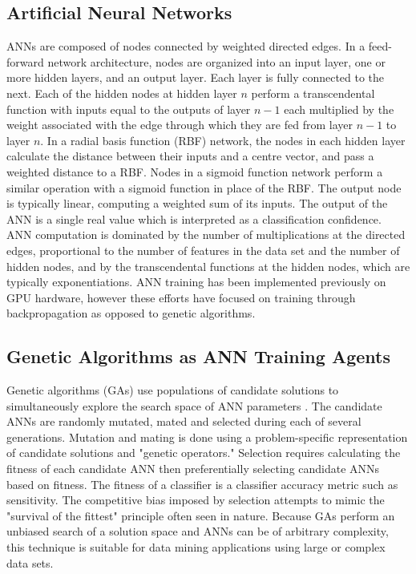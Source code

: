 \documentclass[11pt]{article}       %
\begin{document}
\subsection{Artificial Neural Networks} \label{ann}
ANNs are composed of nodes connected by weighted directed edges. In a feed-forward network architecture, nodes are organized into an input layer, one or more hidden layers, and an output layer. Each layer is fully connected to the next. Each of the hidden nodes at hidden layer $n$ perform a transcendental function with inputs equal to the outputs of layer $n-1$ each multiplied by the weight associated with the edge through which they are fed from layer $n-1$ to layer $n$. In a radial basis function (RBF) network, the nodes in each hidden layer calculate the distance between their inputs and a centre vector, and pass a weighted distance to a RBF. Nodes in a sigmoid function network perform a similar operation with a sigmoid function in place of the RBF. The output node is typically linear, computing a weighted sum of its inputs. The output of the ANN is a single real value which is interpreted as a classification confidence. ANN computation is dominated by the number of multiplications at the directed edges, proportional to the number of features in the data set and the number of hidden nodes, and by the transcendental functions at the hidden nodes, which are typically exponentiations.  ANN training has been implemented previously on GPU hardware, however these efforts have focused on training through backpropagation \cite{backprop} as opposed to genetic algorithms.

\subsection{Genetic Algorithms as ANN Training Agents} \label{ga}
Genetic algorithms (GAs) use populations of candidate solutions to simultaneously explore the search space of ANN parameters \cite{GA-ANN}. The candidate ANNs are randomly mutated, mated and selected during each of several generations. Mutation and mating is done using a problem-specific representation of candidate solutions and "genetic operators." Selection requires calculating the fitness of each candidate ANN  then preferentially selecting candidate ANNs based on fitness. The fitness of a classifier is a classifier accuracy metric such as sensitivity.  The competitive bias imposed by selection attempts to mimic the "survival of the fittest" principle often seen in nature.  Because GAs perform an unbiased search of a solution space and ANNs can be of arbitrary complexity, this technique is suitable for data mining applications using large or complex data sets.
\end{document}
